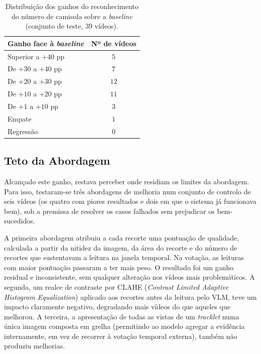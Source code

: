 \begin{table}[htbp]
    \centering
    \caption{Distribuição dos ganhos do reconhecimento do número de camisola sobre a \emph{baseline}
    (conjunto de teste, $39$ vídeos).}
    \label{tab:jnr-distribuicao}
    \begin{tabular}{lc}
        \hline
        \textbf{Ganho face à \emph{baseline}} & \textbf{Nº de vídeos} \\
        \hline
        Superior a $+40$ pp & $5$ \\
        De $+30$ a $+40$ pp & $7$ \\
        De $+20$ a $+30$ pp & $12$ \\
        De $+10$ a $+20$ pp & $11$ \\
        De $+1$ a $+10$ pp  & $3$ \\
        Empate              & $1$ \\
        Regressão           & $0$ \\
        \hline
    \end{tabular}
\end{table}

\subsection{Teto da Abordagem}

Alcançado este ganho, restava perceber onde residiam os limites da abordagem. Para isso, testaram-se três abordagens de melhoria num conjunto de controlo de seis vídeos (os quatro com piores resultados e dois em que o sistema já funcionava bem), sob a premissa de resolver os casos falhados sem prejudicar os bem-sucedidos.

A primeira abordagem atribuiu a cada recorte uma pontuação de qualidade, calculada a partir da nitidez da imagem, da área do recorte e do número de recortes que sustentavam a leitura na janela temporal. Na votação, as leituras com maior pontuação passaram a ter mais peso. O resultado foi um ganho residual e inconsistente, sem qualquer alteração nos vídeos mais problemáticos. A segunda, um realce de contraste por CLAHE (\emph{Contrast Limited Adaptive Histogram Equalization}) aplicado aos recortes antes da leitura pelo VLM, teve um impacto claramente negativo, degradando mais vídeos do que aqueles que melhorou. A terceira, a apresentação de todas as vistas de um \emph{tracklet} numa única imagem composta em grelha (permitindo ao modelo agregar a evidência internamente, em vez de recorrer à votação temporal externa), também não produziu melhorias.

